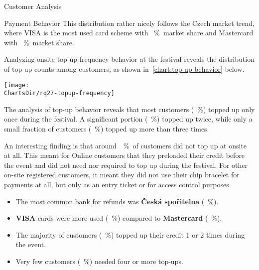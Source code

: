 \begin{section}{Customer Analysis}
\begin{subsection}{Payment Behavior}
		This distribution rather nicely follows the Czech market trend, where VISA is the most used card scheme with ~\%~market share and Mastercard with ~\%~market share\cite{spbk_czech_profil_karty}.

		\pagebreak[4]


		Analyzing onsite top-up frequency behavior at the festival reveals the distribution of top-up counts among customers, as shown in~\autoref{chart:top-up-behavior} below.

		\begin{chart}[h]
			\centering
			\texttt{[image: \\ChartsDir/rq27-topup-frequency]}
			\caption{ Top-up Behavior Analysis}
			\label{chart:top-up-behavior}
			\source
		\end{chart}

		The analysis of top-up behavior reveals that most customers (~\%) topped up only once during the festival.
		A significant portion (~\%) topped up twice, while only a small fraction of customers (~\%) topped up more than three times.

		An interesting finding is that around~~\%~of customers did not top up at onsite at all.
		This meant for Online customers that they preloaded their credit before the event and did not need nor required to top up during the festival.
		For other on-site registered customers, it meant they did not use their chip bracelet for payments at all, but only as an entry ticket or for access control purposes.

		\begin{keytakeaways}
			\begin{itemize}
				\item The most common bank for refunds was \textbf{Česká spořitelna} (~\%).
				\item \textbf{VISA} cards were more used (~\%) compared to \textbf{Mastercard} (~\%).
				\item The majority of customers (~\%) topped up their credit 1 or 2 times during the event.
				\item Very few customers (~\%) needed four or more top-ups.
			\end{itemize}
		\end{keytakeaways}
	\end{subsection}


\end{section}
